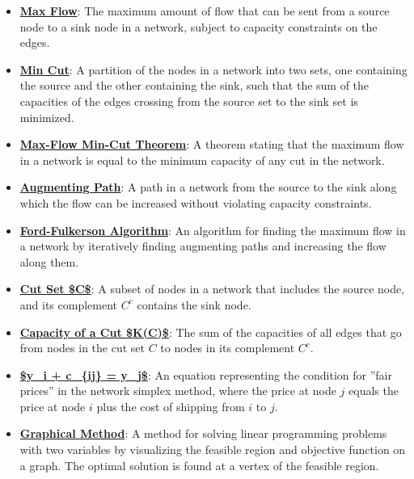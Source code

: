 \documentclass{article}%
\begin{document}
\begin{itemize}[leftmargin=*]%
\item \href{https://www.math.purdue.edu/~yipn/421//2024-11-19-MaxFlowMinCut.pdf#page=1}{\textbf{Max Flow}}: The maximum amount of flow that can be sent from a source node to a sink node in a network, subject to capacity constraints on the edges.%
\item \href{https://www.math.purdue.edu/~yipn/421//2024-11-19-MaxFlowMinCut.pdf#page=2}{\textbf{Min Cut}}: A partition of the nodes in a network into two sets, one containing the source and the other containing the sink, such that the sum of the capacities of the edges crossing from the source set to the sink set is minimized.%
\item \href{https://www.math.purdue.edu/~yipn/421//2024-11-19-MaxFlowMinCut.pdf#page=4}{\textbf{Max{-}Flow Min{-}Cut Theorem}}: A theorem stating that the maximum flow in a network is equal to the minimum capacity of any cut in the network.%
\item \href{https://www.math.purdue.edu/~yipn/421//2024-11-19-MaxFlowMinCut.pdf#page=10}{\textbf{Augmenting Path}}: A path in a network from the source to the sink along which the flow can be increased without violating capacity constraints.%
\item \href{https://www.math.purdue.edu/~yipn/421//2024-11-19-MaxFlowMinCut.pdf#page=10}{\textbf{Ford{-}Fulkerson Algorithm}}: An algorithm for finding the maximum flow in a network by iteratively finding augmenting paths and increasing the flow along them.%
\item \href{https://www.math.purdue.edu/~yipn/421//2024-11-19-MaxFlowMinCut.pdf#page=2}{\textbf{Cut Set \$C\$}}: A subset of nodes in a network that includes the source node, and its complement $C^c$ contains the sink node.%
\item \href{https://www.math.purdue.edu/~yipn/421//2024-11-19-MaxFlowMinCut.pdf#page=2}{\textbf{Capacity of a Cut \$K(C)\$}}: The sum of the capacities of all edges that go from nodes in the cut set $C$ to nodes in its complement $C^c$.%
\end{itemize}%
\begin{itemize}[leftmargin=*]%
\item \href{https://www.math.purdue.edu/~yipn/421//2024-11-21-EconNetSimplex.pdf#page=4}{\textbf{\$y\_i + c\_\{ij\} = y\_j\$}}: An equation representing the condition for ''fair prices'' in the network simplex method, where the price at node $j$ equals the price at node $i$ plus the cost of shipping from $i$ to $j$.%
\end{itemize}%
\begin{itemize}[leftmargin=*]%
\item \href{https://www.math.purdue.edu/~yipn/421//2024-12-03-Duality.pdf#page=3}{\textbf{Graphical Method}}: A method for solving linear programming problems with two variables by visualizing the feasible region and objective function on a graph. The optimal solution is found at a vertex of the feasible region.%
\end{itemize}
\end{document}
